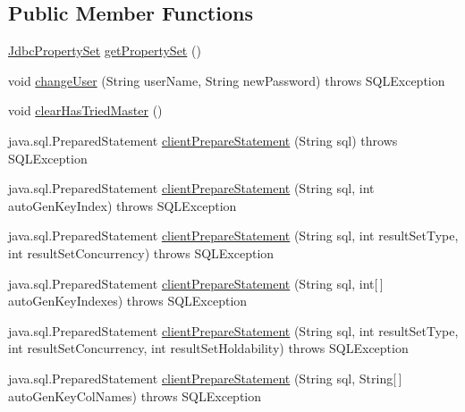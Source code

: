 \subsection*{Public Member Functions}
\begin{DoxyCompactItemize}
\item 
\mbox{\hyperlink{interfacecom_1_1mysql_1_1cj_1_1jdbc_1_1_jdbc_property_set}{Jdbc\+Property\+Set}} \mbox{\hyperlink{interfacecom_1_1mysql_1_1cj_1_1jdbc_1_1_jdbc_connection_a8d7309165f9280946c8ac7a4fb8a22c7}{get\+Property\+Set}} ()
\item 
void \mbox{\hyperlink{interfacecom_1_1mysql_1_1cj_1_1jdbc_1_1_jdbc_connection_aed0496e0f2c1236f2784f92b45a482ef}{change\+User}} (String user\+Name, String new\+Password)  throws S\+Q\+L\+Exception
\item 
void \mbox{\hyperlink{interfacecom_1_1mysql_1_1cj_1_1jdbc_1_1_jdbc_connection_a0594dd85b684e0141c3260245cbb28e0}{clear\+Has\+Tried\+Master}} ()
\item 
java.\+sql.\+Prepared\+Statement \mbox{\hyperlink{interfacecom_1_1mysql_1_1cj_1_1jdbc_1_1_jdbc_connection_a62db1ccf7a070833775481acb5e9e359}{client\+Prepare\+Statement}} (String sql)  throws S\+Q\+L\+Exception
\item 
java.\+sql.\+Prepared\+Statement \mbox{\hyperlink{interfacecom_1_1mysql_1_1cj_1_1jdbc_1_1_jdbc_connection_a1d01e4f2fd60084794906cc9a1c24c24}{client\+Prepare\+Statement}} (String sql, int auto\+Gen\+Key\+Index)  throws S\+Q\+L\+Exception
\item 
java.\+sql.\+Prepared\+Statement \mbox{\hyperlink{interfacecom_1_1mysql_1_1cj_1_1jdbc_1_1_jdbc_connection_a55c0d38bcf8ca54ed272a0a1bbbf7e4c}{client\+Prepare\+Statement}} (String sql, int result\+Set\+Type, int result\+Set\+Concurrency)  throws S\+Q\+L\+Exception
\item 
java.\+sql.\+Prepared\+Statement \mbox{\hyperlink{interfacecom_1_1mysql_1_1cj_1_1jdbc_1_1_jdbc_connection_a11927338ef48e164fdd8444b6b273162}{client\+Prepare\+Statement}} (String sql, int\mbox{[}$\,$\mbox{]} auto\+Gen\+Key\+Indexes)  throws S\+Q\+L\+Exception
\item 
java.\+sql.\+Prepared\+Statement \mbox{\hyperlink{interfacecom_1_1mysql_1_1cj_1_1jdbc_1_1_jdbc_connection_a802cf843e62a0feac95a16c7750a35c3}{client\+Prepare\+Statement}} (String sql, int result\+Set\+Type, int result\+Set\+Concurrency, int result\+Set\+Holdability)  throws S\+Q\+L\+Exception
\item 
java.\+sql.\+Prepared\+Statement \mbox{\hyperlink{interfacecom_1_1mysql_1_1cj_1_1jdbc_1_1_jdbc_connection_a46a218367bb0a386a18caed711142d7a}{client\+Prepare\+Statement}} (String sql, String\mbox{[}$\,$\mbox{]} auto\+Gen\+Key\+Col\+Names)  throws S\+Q\+L\+Exception

\end{DoxyCompactItemize}
